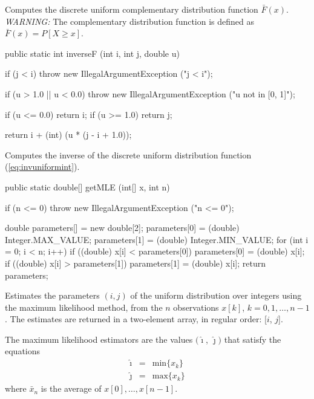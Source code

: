  \begin{tabb}
  Computes the discrete uniform complementary distribution function
  $\bar{F}(x)$.
  \emph{WARNING:} The complementary distribution function is defined as
    $\bar F(x) = P[X \ge x]$.
 \end{tabb}
\begin{code}

   public static int inverseF (int i, int j, double u)\begin{hide} {
      if (j < i)
        throw new IllegalArgumentException ("j < i");

       if (u > 1.0 || u < 0.0)
           throw new IllegalArgumentException ("u not in [0, 1]");

       if (u <= 0.0)
           return i;
       if (u >= 1.0)
           return j;

       return i + (int) (u * (j - i + 1.0));
   }\end{hide}
\end{code}
  \begin{tabb}
  Computes the inverse of the discrete uniform distribution function
 (\ref{eq:invuniformint}).
 \end{tabb}
\begin{code}

   public static double[] getMLE (int[] x, int n)\begin{hide} {
      if (n <= 0)
         throw new IllegalArgumentException ("n <= 0");

      double parameters[] = new double[2];
      parameters[0] = (double) Integer.MAX_VALUE;
      parameters[1] = (double) Integer.MIN_VALUE;
      for (int i = 0; i < n; i++) {
         if ((double) x[i] < parameters[0])
            parameters[0] = (double) x[i];
         if ((double) x[i] > parameters[1])
            parameters[1] = (double) x[i];
      }
      return parameters;
   }\end{hide}
\end{code}
\begin{tabb}
   Estimates the parameters $(i, j)$ of the uniform distribution
   over integers using the maximum likelihood method, from the $n$ observations
   $x[k]$, $k = 0, 1, \ldots, n-1$. The estimates are returned in a two-element
    array, in regular order: [$i$, $j$].
   \begin{detailed}
   The maximum likelihood estimators are the values
   $(\hat{\imath}$, $\hat{\jmath})$ that satisfy the equations
   \begin{eqnarray*}
      \hat{\imath} & = & \mbox{min} \{x_k\}\\
      \hat{\jmath} & = & \mbox{max} \{x_k\}
   \end{eqnarray*}
   where  $\bar x_n$ is the average of $x[0],\dots,x[n-1]$.
   \end{detailed}
\end{tabb}

